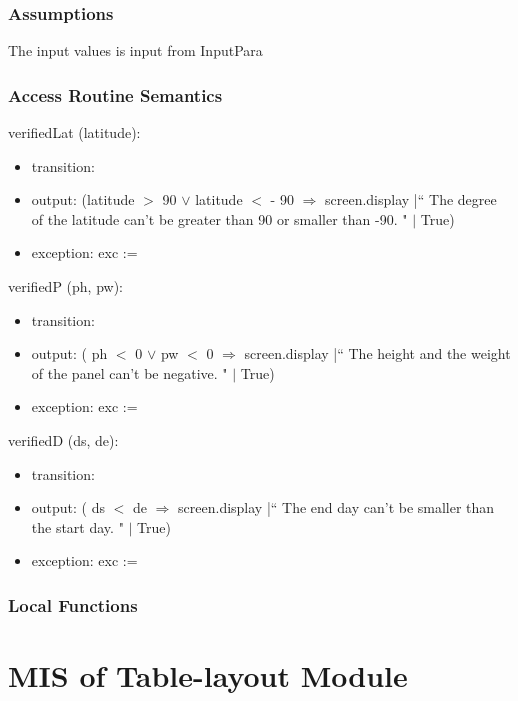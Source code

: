 \documentclass[12pt, titlepage]{article}
\begin{document}
\subsubsection{Assumptions}
The input values is input from InputPara


\subsubsection{ Access Routine Semantics}

\noindent  verifiedLat (latitude):
\begin{itemize}
\item transition: 
\item output: (latitude $>$ 90 $\lor$ latitude $<$ - 90 $\Rightarrow$ screen.display |`` The degree of the latitude can't be greater than 90 or smaller than -90. " $|$ True)
\item exception: exc := 
\end{itemize}

\noindent  verifiedP (ph, pw):
\begin{itemize}
\item transition: 
\item output: ( ph $<$ 0 $\lor$ pw $<$ 0 $\Rightarrow$ screen.display |`` The height and the weight of the panel can't be negative. " $|$ True)
\item exception: exc := 
\end{itemize}

\noindent  verifiedD (ds, de):
\begin{itemize}
\item transition: 
\item output: ( ds $<$ de $\Rightarrow$ screen.display |`` The end day can't be smaller than the start day. " $|$ True)
\item exception: exc := 
\end{itemize}

\subsubsection{Local Functions}



\newpage



\section{MIS of Table-layout Module} \label{ModuleT} 
\end{document}
